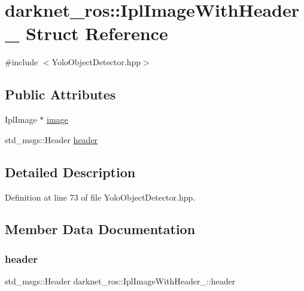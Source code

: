 \hypertarget{structdarknet__ros_1_1IplImageWithHeader__}{}\section{darknet\+\_\+ros\+::Ipl\+Image\+With\+Header\+\_\+ Struct Reference}
\label{structdarknet__ros_1_1IplImageWithHeader__}


{\ttfamily \#include $<$Yolo\+Object\+Detector.\+hpp$>$}

\subsection*{Public Attributes}
\begin{DoxyCompactItemize}
\item 
Ipl\+Image $\ast$ \mbox{\hyperlink{structdarknet__ros_1_1IplImageWithHeader___acaccc5a13d1573a180d4a95dbf0d42dc}{image}}
\item 
std\+\_\+msgs\+::\+Header \mbox{\hyperlink{structdarknet__ros_1_1IplImageWithHeader___ac944f5674e9a9d7bff514d28b06dce47}{header}}
\end{DoxyCompactItemize}


\subsection{Detailed Description}


Definition at line 73 of file Yolo\+Object\+Detector.\+hpp.



\subsection{Member Data Documentation}
\mbox{\label{structdarknet__ros_1_1IplImageWithHeader___ac944f5674e9a9d7bff514d28b06dce47}} 
\subsubsection{\texorpdfstring{header}{header}}
{\footnotesize\ttfamily std\+\_\+msgs\+::\+Header darknet\+\_\+ros\+::\+Ipl\+Image\+With\+Header\+\_\+\+::header}



